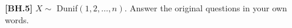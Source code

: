 \begin{exercise}\label{ex65}
	\textbf{[BH.5]} $X\sim$ Dunif$(1, 2, \ldots, n)$. Answer the original questions in your own words. 
\end{exercise}